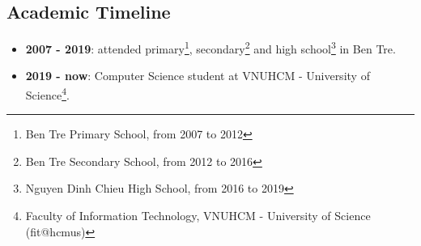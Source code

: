 \documentclass{article}
\begin{document}
        \subsection{Academic Timeline}
            \begin{itemize}
                \item {\bfseries{2007 - 2019}}:
                attended primary\footnote{Ben Tre Primary School, from 2007 to 2012}, secondary\footnote{Ben Tre Secondary School, from 2012 to 2016} and high school\footnote{Nguyen Dinh Chieu High School, from 2016 to 2019} in Ben Tre.
                \item {\bfseries{2019 - now}}: Computer Science student at VNUHCM - University of Science\footnote{Faculty of Information Technology, VNUHCM - University of Science (fit@hcmus)}.
            \end{itemize}

\end{document}
